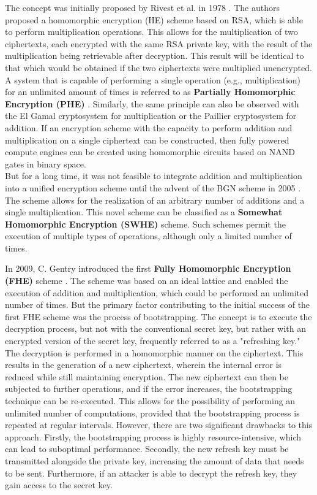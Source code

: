 The concept was initially proposed by Rivest et al. in 1978 \cite{Rivest1978}. The authors proposed a homomorphic encryption (HE) scheme based on RSA, which is able to perform multiplication operations. This allows for the multiplication of two ciphertexts, each encrypted with the same RSA private key, with the result of the multiplication being retrievable after decryption. This result will be identical to that which would be obtained if the two ciphertexts were multiplied unencrypted. A system that is capable of performing a single operation (e.g., multiplication) for an unlimited amount of times is referred to as \textbf{Partially Homomorphic Encryption (PHE)}  \cite{FheImplementations, SurveyOfHomomorphicEncryption}. Similarly, the same principle can also be observed with the El Gamal cryptosystem \cite{ElGamal} for multiplication or the Paillier cryptosystem \cite{Paillier} for addition. If an encryption scheme with the capacity to perform addition and multiplication on a single ciphertext can be constructed, then fully powered compute engines can be created using homomorphic circuits based on NAND gates in binary space. \\
But for a long time, it was not feasible to integrate addition and multiplication into a unified encryption scheme until the advent of the BGN scheme in 2005 \cite{BGN}. The scheme allows for the realization of an arbitrary number of additions and a single multiplication. This novel scheme can be classified as a  \textbf{Somewhat Homomorphic Encryption (SWHE)}  scheme. Such schemes permit the execution of multiple types of operations, although only a limited number of times.

In 2009, C. Gentry introduced the first  \textbf{Fully Homomorphic Encryption (FHE)} scheme \cite{Gentry2009AFH}. The scheme was based on an ideal lattice and enabled the execution of addition and multiplication, which could be performed an unlimited number of times. But the primary factor contributing to the initial success of the first FHE scheme was the process of bootstrapping. The concept is to execute the decryption process, but not with the conventional secret key, but rather with an encrypted version of the secret key, frequently referred to as a "refreshing key." The decryption is performed in a homomorphic manner on the ciphertext. This results in the generation of a new ciphertext, wherein the internal error is reduced while still maintaining encryption. The new ciphertext can then be subjected to further operations, and if the error increases, the bootstrapping technique can be re-executed. This allows for the possibility of performing an unlimited number of computations, provided that the bootstrapping process is repeated at regular intervals. However, there are two significant drawbacks to this approach. Firstly, the bootstrapping process is highly resource-intensive, which can lead to suboptimal performance. Secondly, the new refresh key must be transmitted alongside the private key, increasing the amount of data that needs to be sent. Furthermore, if an attacker is able to decrypt the refresh key, they gain access to the secret key. 


